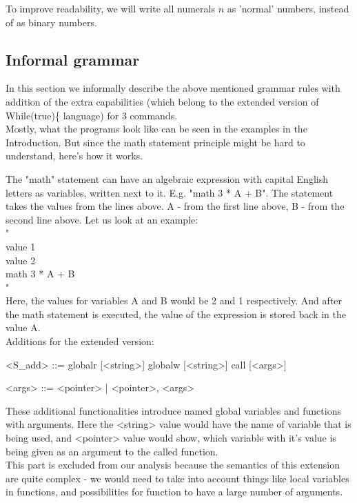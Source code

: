 \documentclass{article}
\begin{document}
To improve readability, we will write all numerals $n$ as 'normal' numbers, instead of as binary numbers.

\subsection{Informal grammar}
In this section we informally describe the above mentioned grammar rules with addition of the extra capabilities (which belong to the extended version of While(true)\{ language) for 3 commands.\\

Mostly, what the programs look like can be seen in the examples in the Introduction. But since the math statement principle might be hard to understand, here's how it works.

The "math" statement can have an algebraic expression with capital English letters as variables, written next to it. E.g. "math 3 * A + B". The statement takes the values from the lines above. A - from the first line above, B - from the second line above. Let us look at an example: \\
"\\
value 1\\
value 2\\
math 3 * A + B\\
"\\
Here, the values for variables A and B would be 2 and 1 respectively. And after the math statement is executed, the value of the expression is stored back in the value A.\\


Additions for the extended version:
\begin{grammar}
<S_add> ::= globalr [<string>]
\alt globalw [<string>]
\alt call [<args>]

<args> ::= <pointer> | <pointer>, <args>

\end{grammar}

These additional functionalities introduce named global variables and functions with arguments. 
Here the <string> value would have the name of variable that is being used, and <pointer> value would show, which variable with it's value is being given as an argument to the called function.\\

This part is excluded from our analysis because the semantics of this extension are quite complex - we would need to take into account things like local variables in functions, and possibilities for function to have a large number of arguments.
\end{document}
